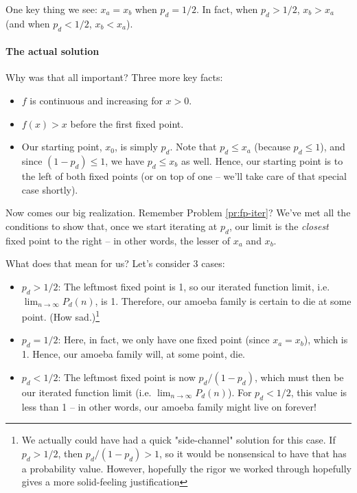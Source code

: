 One key thing we see: $x_a = x_b$ when $p_d = 1/2$. In fact, when $p_d > 1/2$, $x_b > x_a$ (and when $p_d < 1/2$, $x_b < x_a$). 




\paragraph{The actual solution}

Why was that all important? Three more key facts:

\begin{itemize}
\item $f$ is continuous and increasing for $x > 0$. 
\item $f(x) > x$ before the first fixed point. 
\item Our starting point, $x_0$, is simply $p_d$. Note that $p_d \leq x_a$ (because $p_d \leq 1$), and since $(1 - p_d) \leq 1$, we have $p_d \leq x_b$ as well. Hence, our starting point is to the left of both fixed points (or on top of one -- we'll take care of that special case shortly). 
\end{itemize}

Now comes our big realization. Remember Problem \ref{pr:fp-iter}? We've met all the conditions to show that, once we start iterating at $p_d$, our limit is the \emph{closest} fixed point to the right -- in other words, the lesser of $x_a$ and $x_b$.

What does that mean for us? Let's consider 3 cases:

\begin{itemize}
\item $p_d > 1/2$: The leftmost fixed point is 1, so our iterated function limit, i.e. $\lim_{n \rightarrow \infty} P_d(n)$, is 1. Therefore, our amoeba family is certain to die at some point. (How sad.)\footnote{We actually could have had a quick "side-channel" solution for this case. If $p_d > 1/2$, then $p_d / (1 - p_d) > 1$, so it would be nonsensical to have that has a probability value. However, hopefully the rigor we worked through hopefully gives a more solid-feeling justification}
\item $p_d = 1/2$: Here, in fact, we only have one fixed point (since $x_a = x_b$), which is 1. Hence, our amoeba family will, at some point, die.
\item $p_d < 1/2$: The leftmost fixed point is now $p_d / (1 - p_d)$, which must then be our iterated function limit (i.e. $\lim_{n \rightarrow \infty} P_d(n)$). For $p_d < 1/2$, this value is less than 1 -- in other words, our amoeba family might live on forever!
\end{itemize}


